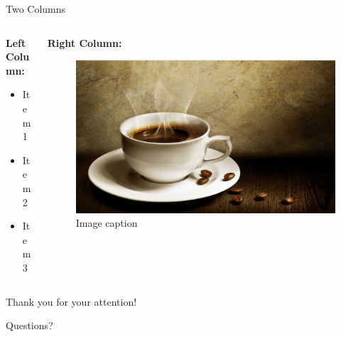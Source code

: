 \documentclass[10pt]{beamer}  %
\begin{document}
\begin{frame}{Two Columns}
    \begin{columns}
        \begin{column}{0.48\textwidth}
            \textbf{Left Column:}
            \begin{itemize}
                \item Item 1
                \item Item 2
                \item Item 3
            \end{itemize}
        \end{column}
        \begin{column}{0.48\textwidth}
            \textbf{Right Column:}
            \begin{figure}
                \centering
                \includegraphics[width=\linewidth]{images/coffee.png}
                \caption{Image caption}
            \end{figure}
        \end{column}
    \end{columns}
\end{frame}

\begin{frame}
    \centering
    \LARGE Thank you for your attention!
    
    \vspace{1em}
    
    \large Questions?
\end{frame}
\end{document}
